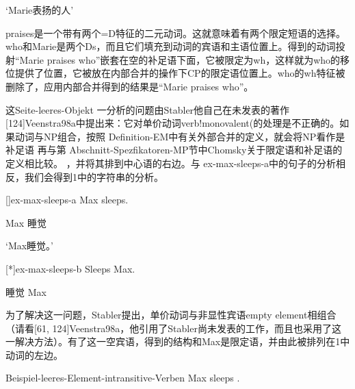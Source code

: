 `Marie表扬的人'

praises是一个带有两个=D特征的二元动词。这就意味着有两个限定短语的选择。who和Marie是两个Ds，而且它们填充到动词的宾语和主语位置上。得到的动词投射“Marie praises who”嵌套在空的补足语下面，它被限定为wh，这样就为who的移位提供了位置，它被放在内部合并的操作下CP的限定语位置上。who的wh特征被删除了，应用内部合并得到的结果是“Marie praises who”。







这Seite-leeres-Objekt 一分析的问题由Stabler他自己在未发表的著作[124]Veenstra98a中提出来：它对单价动词verb!monovalent(的处理是不正确的。如果动词与NP组合，按照 Definition-EM中有关外部合并的定义，就会将NP看作是补足语 
再与第 Abschnitt-Spezfikatoren-MP节中Chomsky关于限定语和补足语的定义相比较。
，并将其排到中心语的右边。与 ex-max-sleeps-a中的句子的分析相反，我们会得到1中的字符串的分析。












































[]ex-max-sleeps-a
Max sleeps.

Max 睡觉

`Max睡觉。'

[*]ex-max-sleeps-b
Sleeps Max.

睡觉 Max



为了解决这一问题，Stabler提出，单价动词与非显性宾语empty element相组合（请看[61, 124]Veenstra98a，他引用了Stabler尚未发表的工作，而且也采用了这一解决方法）。有了这一空宾语，得到的结构和Max是限定语，并由此被排列在1中动词的左边。





Beispiel-leeres-Element-intransitive-Verben
Max sleeps .

